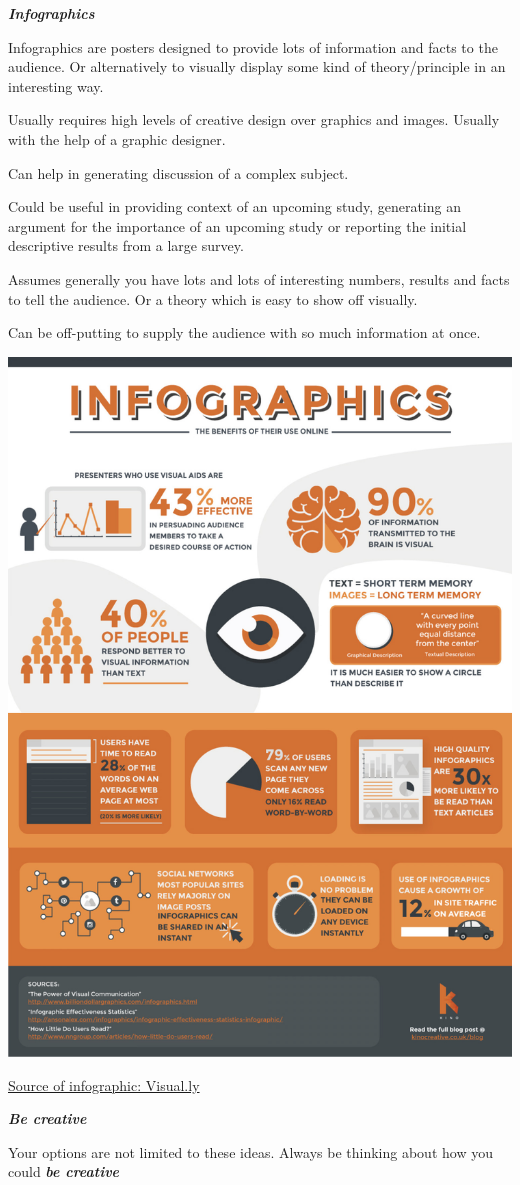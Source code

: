 \documentclass[
]{book}
\begin{document}
\textbf{\emph{Infographics}}

Infographics are posters designed to provide lots of information and facts to the audience. Or alternatively to visually display some kind of theory/principle in an interesting way.

Usually requires high levels of creative design over graphics and images. Usually with the help of a graphic designer.

Can help in generating discussion of a complex subject.

Could be useful in providing context of an upcoming study, generating an argument for the importance of an upcoming study or reporting the initial descriptive results from a large survey.

Assumes generally you have lots and lots of interesting numbers, results and facts to tell the audience. Or a theory which is easy to show off visually.

Can be off-putting to supply the audience with so much information at once.

\begin{center}\includegraphics[width=0.5\linewidth,height=0.25\textheight]{img/infographic} \end{center}

\href{https://visual.ly/community/Infographics/technology/infographics-benefits-their-use-online?utm_source=visually_embed}{Source of infographic: Visual.ly}

\textbf{\emph{Be creative}}

Your options are not limited to these ideas. Always be thinking about how you could \textbf{\emph{be creative}}
\end{document}
